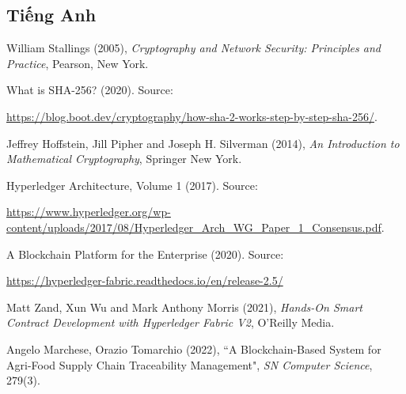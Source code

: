 
\begin{thebibliography}{1}
    \subsection*{Tiếng Anh}
    \setlength{\bibindent}{1cm}
    \setlength{\itemindent}{-\bibindent}
  
    \raggedright
    William Stallings (2005),
    \emph{Cryptography and Network Security: Principles and Practice}, Pearson, New York.

      What is SHA-256? (2020).
      Source:

    \url{https://blog.boot.dev/cryptography/how-sha-2-works-step-by-step-sha-256/}.
  
        
    \raggedright
    Jeffrey Hoffstein, Jill Pipher and Joseph H. Silverman (2014),
    \emph{An Introduction to Mathematical Cryptography}, Springer New York.

    \raggedright
    Hyperledger  Architecture, Volume 1 (2017). Source:

    \url{https://www.hyperledger.org/wp-content/uploads/2017/08/Hyperledger_Arch_WG_Paper_1_Consensus.pdf}.
  
    \raggedright
    A Blockchain Platform for the Enterprise (2020). Source:

    \url{https://hyperledger-fabric.readthedocs.io/en/release-2.5/}

    \raggedright
    Matt Zand, Xun Wu and Mark Anthony Morris (2021),
    \emph{Hands-On Smart Contract Development with Hyperledger Fabric V2},  O'Reilly Media.

    \raggedright
    Angelo Marchese, Orazio Tomarchio (2022),
    ``A Blockchain-Based System for Agri-Food Supply Chain Traceability Management", \emph{SN Computer Science}, 279(3).


  \end{thebibliography}

